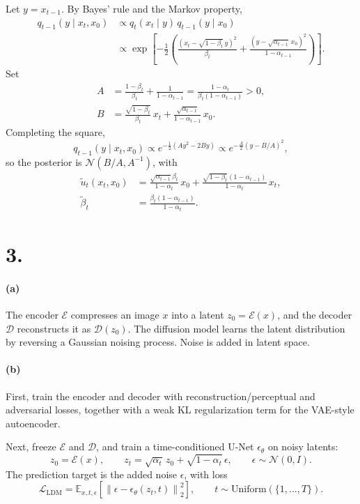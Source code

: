 \documentclass[11pt,a4paper]{article}
\newcommand{\E}{\mathbb{E}}
\newcommand{\N}{\mathcal{N}}
\begin{document}
Let \(y=x_{t-1}\). By Bayes' rule and the Markov property,
\[
\begin{aligned}
q_{t-1}(y\mid x_t,x_0)
&\propto q_t(x_t\mid y)\,q_{t-1}(y\mid x_0)\\
&\propto \exp\!\left[
-\frac12\left(
\frac{(x_t-\sqrt{1-\beta_t}\,y)^2}{\beta_t}
+\frac{(y-\sqrt{\alpha_{t-1}}\,x_0)^2}{1-\alpha_{t-1}}
\right)\right].
\end{aligned}
\]
Set
\[
\begin{aligned}
A&=\frac{1-\beta_t}{\beta_t}+\frac{1}{1-\alpha_{t-1}}
=\frac{1-\alpha_t}{\beta_t(1-\alpha_{t-1})}>0,\\
B&=\frac{\sqrt{1-\beta_t}}{\beta_t}\,x_t
+\frac{\sqrt{\alpha_{t-1}}}{1-\alpha_{t-1}}\,x_0.
\end{aligned}
\]
Completing the square,
\[
q_{t-1}(y\mid x_t,x_0)
\propto e^{-\frac12(Ay^2-2By)}
\propto e^{-\frac A2(y-B/A)^2},
\]
so the posterior is \(\N(B/A,A^{-1})\), with
\[
\boxed{
\begin{aligned}
\tilde u_t(x_t,x_0)
&=\frac{\sqrt{\alpha_{t-1}}\beta_t}{1-\alpha_t}\,x_0
+\frac{\sqrt{1-\beta_t}(1-\alpha_{t-1})}{1-\alpha_t}\,x_t,\\
\tilde\beta_t
&=\frac{\beta_t(1-\alpha_{t-1})}{1-\alpha_t}.
\end{aligned}}
\]

\clearpage
\section*{3.}

\paragraph{(a)}
The encoder \(\mathcal E\) compresses an image \(x\) into a latent
\(z_0=\mathcal E(x)\), and the decoder \(\mathcal D\) reconstructs it as
\(\mathcal D(z_0)\). The diffusion model learns the latent distribution
by reversing a Gaussian noising process. Noise is added in latent space.

\paragraph{(b)}
First, train the encoder and decoder with reconstruction/perceptual
and adversarial losses, together with a weak KL regularization term
for the VAE-style autoencoder.

Next, freeze \(\mathcal E\) and \(\mathcal D\), and train a
time-conditioned U-Net \(\epsilon_\theta\) on noisy latents:
\[
z_0=\mathcal E(x),\qquad
z_t=\sqrt{\alpha_t}\,z_0+\sqrt{1-\alpha_t}\,\epsilon,
\qquad \epsilon\sim\N(0,I).
\]
The prediction target is the added noise \(\epsilon\), with loss
\[
\boxed{
\mathcal L_{\mathrm{LDM}}
=\E_{x,t,\epsilon}\!\left[
\left\|\epsilon-\epsilon_\theta(z_t,t)\right\|_2^2
\right],
\qquad t\sim\mathrm{Uniform}(\{1,\ldots,T\}).
}
\]
\end{document}
